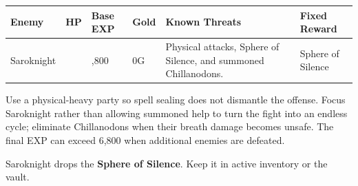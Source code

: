 \documentclass[
  american,
  10pt,
  letterpaper,
  oneside,
  open=any]{scrreprt}
\newcounter{none} %
\newenvironment{guidetable}{%
  \small\setstretch{1.0}%
  \setlength{\tabcolsep}{4pt}%
  \setlength{\LTpre}{8pt}\setlength{\LTpost}{10pt}%
  \renewcommand{\arraystretch}{1.16}%
}{ }
\begin{document}
\begin{guidetable}

{\def\LTcaptype{none} %
\begin{longtable}[]{@{}
  >{\raggedright\arraybackslash}p{}
  >{\raggedleft\arraybackslash}p{}
  >{\raggedleft\arraybackslash}p{}
  >{\raggedleft\arraybackslash}p{}
  >{\raggedright\arraybackslash}p{}
  >{\raggedright\arraybackslash}p{}@{}}
\toprule\noalign{}
\begin{minipage}[b]{\linewidth}\raggedright
\color{GuideGreen}\bfseries Enemy
\end{minipage} & \begin{minipage}[b]{\linewidth}\raggedleft
\color{GuideGreen}\bfseries HP
\end{minipage} & \begin{minipage}[b]{\linewidth}\raggedleft
\color{GuideGreen}\bfseries Base EXP
\end{minipage} & \begin{minipage}[b]{\linewidth}\raggedleft
\color{GuideGreen}\bfseries Gold
\end{minipage} & \begin{minipage}[b]{\linewidth}\raggedright
\color{GuideGreen}\bfseries Known Threats
\end{minipage} & \begin{minipage}[b]{\linewidth}\raggedright
\color{GuideGreen}\bfseries Fixed Reward
\end{minipage} \\
\midrule\noalign{}
\endhead
\bottomrule\noalign{}
\endlastfoot
Saroknight & 800 & 6,800 & 0G & Physical attacks, Sphere of Silence, and
summoned Chillanodons. & Sphere of Silence \\
\end{longtable}
}

\end{guidetable}

Use a physical-heavy party so spell sealing does not dismantle the
offense. Focus Saroknight rather than allowing summoned help to turn the
fight into an endless cycle; eliminate Chillanodons when their breath
damage becomes unsafe. The final EXP can exceed 6,800 when additional
enemies are defeated.

Saroknight drops the \textbf{Sphere of Silence}. Keep it in active
inventory or the vault.
\end{document}
